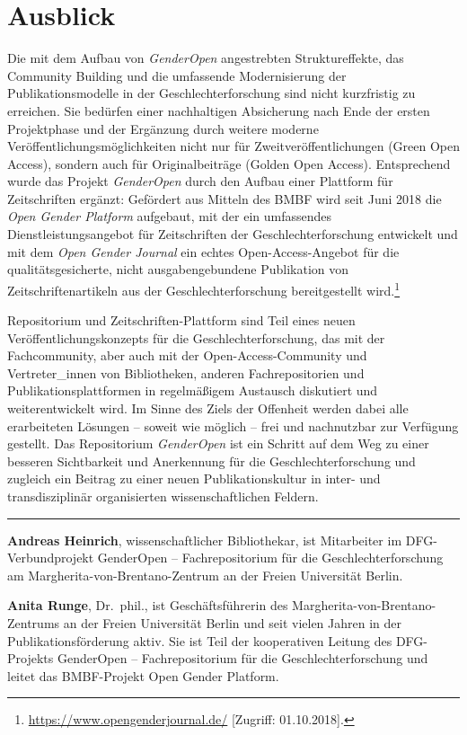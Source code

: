 \documentclass[a4paper,
fontsize=11pt,
oneside,
numbers=noperiodatend,
parskip=half-,
bibliography=totoc,
final
]{scrartcl}
\begin{document}
\hypertarget{ausblick}{%
\section{Ausblick}\label{ausblick}}

Die mit dem Aufbau von \emph{GenderOpen} angestrebten Struktureffekte,
das Community Building und die umfassende Modernisierung der
Publikationsmodelle in der Geschlechterforschung sind nicht kurzfristig
zu erreichen. Sie bedürfen einer nachhaltigen Absicherung nach Ende der
ersten Projektphase und der Ergänzung durch weitere moderne
Veröffentlichungsmöglichkeiten nicht nur für Zweitveröffentlichungen
(Green Open Access), sondern auch für Originalbeiträge (Golden Open
Access). Entsprechend wurde das Projekt \emph{GenderOpen} durch den
Aufbau einer Plattform für Zeitschriften ergänzt: Gefördert aus Mitteln
des BMBF wird seit Juni 2018 die \emph{Open Gender Platform} aufgebaut,
mit der ein umfassendes Dienstleistungsangebot für Zeitschriften der
Geschlechterforschung entwickelt und mit dem \emph{Open Gender Journal}
ein echtes Open-Access-Angebot für die qualitätsgesicherte, nicht
ausgabengebundene Publikation von Zeitschriftenartikeln aus der
Geschlechterforschung bereitgestellt wird.\footnote{\url{https://www.opengenderjournal.de/}
  {[}Zugriff: 01.10.2018{]}.}

Repositorium und Zeitschriften-Plattform sind Teil eines neuen
Veröffentlichungskonzepts für die Geschlechterforschung, das mit der
Fachcommunity, aber auch mit der Open-Access-Comm\-unity und
Vertreter\_innen von Bibliotheken, anderen Fachrepositorien und
Publikationsplattformen in regelmäßigem Austausch diskutiert und
weiterentwickelt wird. Im Sinne des Ziels der Offenheit werden dabei
alle erarbeiteten Lösungen -- soweit wie möglich -- frei und nachnutzbar
zur Verfügung gestellt. Das Repositorium \emph{GenderOpen} ist ein
Schritt auf dem Weg zu einer besseren Sichtbarkeit und Anerkennung für
die Geschlechterforschung und zugleich ein Beitrag zu einer neuen
Publikationskultur in inter- und transdisziplinär organisierten
wissenschaftlichen Feldern.

\begin{center}\rule{0.5\linewidth}{\linethickness}\end{center}

\textbf{Andreas Heinrich}, wissenschaftlicher Bibliothekar, ist
Mitarbeiter im DFG-Verbundprojekt GenderOpen -- Fachrepositorium für die
Geschlechterforschung am Margherita-von-Brentano-Zentrum an der Freien
Universität Berlin.

\textbf{Anita Runge}, Dr.~phil., ist Geschäftsführerin des
Margherita-von-Brentano-Zentrums an der Freien Universität Berlin und
seit vielen Jahren in der Publikationsförderung aktiv. Sie ist Teil der
kooperativen Leitung des DFG-Projekts GenderOpen -- Fachrepositorium
für die Geschlechterforschung und leitet das BMBF-Projekt Open Gender
Platform.
\end{document}
